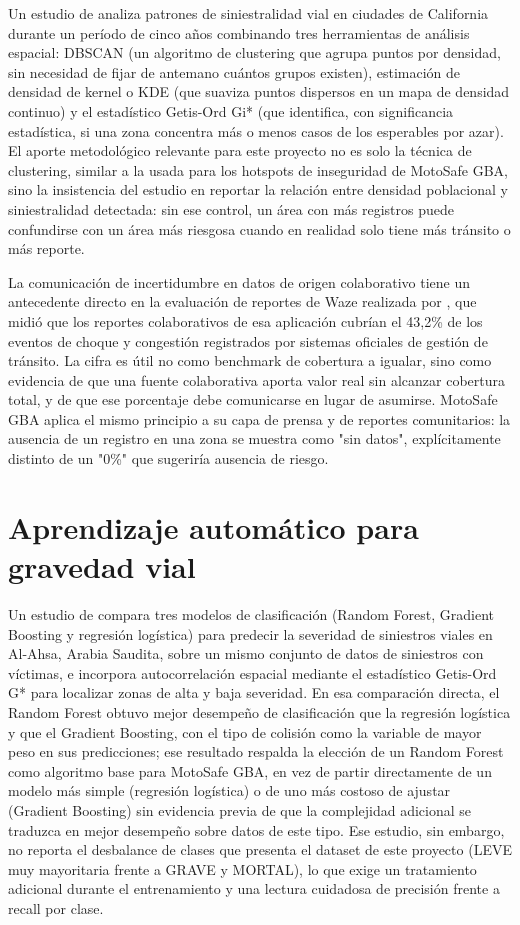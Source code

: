 Un estudio de \citet{alsahfi2024} analiza patrones de siniestralidad vial en
ciudades de California durante un período de cinco años combinando tres
herramientas de análisis espacial: DBSCAN (un algoritmo de clustering
que agrupa puntos por densidad, sin necesidad de fijar de antemano
cuántos grupos existen), estimación de densidad de kernel o KDE (que
suaviza puntos dispersos en un mapa de densidad continuo) y el
estadístico Getis-Ord Gi* (que identifica, con significancia
estadística, si una zona concentra más o menos casos de los esperables
por azar). El aporte metodológico relevante para este proyecto no es
solo la técnica de clustering, similar a la usada para los hotspots de
inseguridad de MotoSafe GBA, sino la insistencia del estudio en reportar
la relación entre densidad poblacional y siniestralidad detectada: sin
ese control, un área con más registros puede confundirse con un área más
riesgosa cuando en realidad solo tiene más tránsito o más reporte.

La comunicación de incertidumbre en datos de origen colaborativo tiene
un antecedente directo en la evaluación de reportes de Waze realizada
por \citet{aminnaseri2018}, que midió que los reportes colaborativos
de esa aplicación cubrían el 43,2\% de los eventos de choque y
congestión registrados por sistemas oficiales de gestión de tránsito. La
cifra es útil no como benchmark de cobertura a igualar, sino como
evidencia de que una fuente colaborativa aporta valor real sin alcanzar
cobertura total, y de que ese porcentaje debe comunicarse en lugar de
asumirse. MotoSafe GBA aplica el mismo principio a su capa de prensa y
de reportes comunitarios: la ausencia de un registro en una zona se
muestra como "sin datos", explícitamente distinto de un "0\%" que
sugeriría ausencia de riesgo.

\section{Aprendizaje automático para gravedad vial}

Un estudio de \citet{islam2022} compara tres modelos de clasificación
(Random Forest, Gradient Boosting y regresión logística) para predecir
la severidad de siniestros viales en Al-Ahsa, Arabia Saudita, sobre un
mismo conjunto de datos de siniestros con víctimas, e incorpora
autocorrelación espacial mediante el estadístico Getis-Ord G* para
localizar zonas de alta y baja severidad. En esa comparación directa, el
Random Forest obtuvo mejor desempeño de clasificación que la regresión
logística y que el Gradient Boosting, con el tipo de colisión como la
variable de mayor peso en sus predicciones; ese resultado respalda la
elección de un Random Forest como algoritmo base para MotoSafe GBA, en
vez de partir directamente de un modelo más simple (regresión logística)
o de uno más costoso de ajustar (Gradient Boosting) sin evidencia previa
de que la complejidad adicional se traduzca en mejor desempeño sobre
datos de este tipo. Ese estudio, sin embargo, no reporta el desbalance
de clases que presenta el dataset de este proyecto (LEVE muy mayoritaria
frente a GRAVE y MORTAL), lo que exige un tratamiento adicional durante
el entrenamiento y una lectura cuidadosa de precisión frente a recall
por clase.

